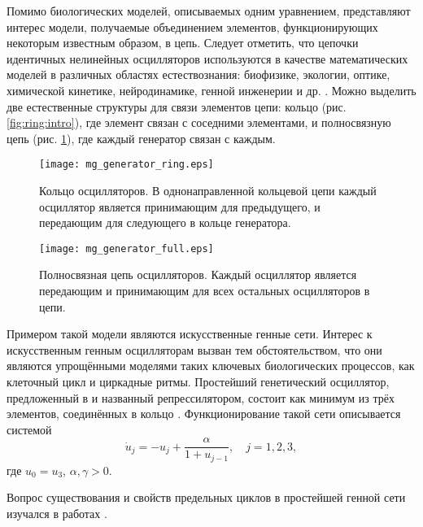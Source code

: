 Помимо биологических моделей, описываемых одним уравнением, представляют интерес модели, получаемые объединением элементов, функционирующих некоторым известным образом, в цепь. Следует отметить, что цепочки идентичных нелинейных осцилляторов используются в качестве математических моделей в различных областях естествознания: биофизике, экологии, оптике, химической кинетике, нейродинамике, генной инженерии и др. \cite{Goodwin1963}. Можно выделить две естественные структуры для связи элементов цепи: кольцо (рис. \ref{fig:ring:intro}), где элемент связан с соседними элементами, и полносвязную цепь (рис. \ref{fig:full_mesh:intro}), где каждый генератор связан с каждым.

\begin{figure}[ht]
	\begin{minipage}[b]{0.45\linewidth}
		\centering
		\texttt{[image: mg\_generator\_ring.eps]}
		\caption{Кольцо осцилляторов. В однонаправленной кольцевой цепи каждый осциллятор является принимающим для предыдущего, и передающим для следующего в кольце генератора.}
		\label{fig:ring:intro}
	\end{minipage}
	\hspace{0.5cm}
	\begin{minipage}[b]{0.45\linewidth}
		\centering
		\texttt{[image: mg\_generator\_full.eps]}
		\caption{Полносвязная цепь осцилляторов. Каждый осциллятор является передающим и принимающим для всех остальных осцилляторов в цепи.}
		\label{fig:full_mesh:intro}
	\end{minipage}
\end{figure}

Примером такой модели являются искусственные генные сети. Интерес к искусственным генным осцилляторам вызван тем обстоятельством, что они являются упрощёнными моделями таких ключевых биологических процессов, как клеточный цикл и циркадные ритмы. Простейший генетический осциллятор, предложенный в \cite{Elowitz2000} и названный репрессилятором, состоит как минимум из трёх элементов, соединённых в кольцо \cite{GlyzinBook2018}. Функционирование такой сети описывается системой
\begin{equation}
	\label{eq:intro:repressilator}
	\dot{u}_j = -u_j + \dfrac{\alpha}{1 + u_{j - 1}}, \quad j = 1, 2, 3,
\end{equation}
где $u_0 = u_3$, $\alpha, \gamma > 0$.

Вопрос существования и свойств предельных циклов в простейшей генной сети изучался в работах \cite{Volokitin2004, Buse2009, Buse2010}.

